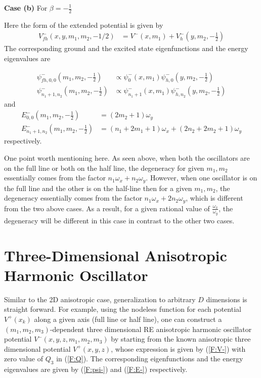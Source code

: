 \documentclass[12pt]{article}
\numberwithin{equation}{section} %
\begin{document}
{\bf Case (b)} For \(\beta = -\frac{1}{2}\)

Here the form of the extended potential is given by
\begin{align}
	V^-_{fh}(x,y,m_1,m_2,-1/2) &= V^-(x,m_1)+V_h^-(y,m_2,-\frac{1}{2})
\end{align}
The corresponding ground and the excited state eigenfunctions and the energy 
eigenvalues are

\begin{align}
	\psi^-_{fh,0,0}(m_1,m_2,-\frac{1}{2}) &\propto \psi^-_0 (x,m_1)\psi^-_{h,0}(y,m_2,-\frac{1}{2})  \\ 
	\psi^-_{n_1+1,n_2}(m_1,m_2,-\frac{1}{2}) &\propto \psi^-_{n_1+1} (x,m_1)\psi^-_{h,n_2}(y,m_2,-\frac{1}{2})
\end{align}
and 
\begin{align} 
	E^-_{0,0}(m_1,m_2,-\frac{1}{2}) &=\left(2m_2+1\right)\omega_y\\
	E^-_{n_1+1,n_2}(m_1,m_2,-\frac{1}{2}) &= \left(n_1+2m_1+1\right)\omega_x+ \left(2n_2+2m_2+1\right)\omega_y
\end{align}
respectively. 

One point worth mentioning here. As seen above, when both the oscillators are on the full line or both on the half line, the degeneracy for given $m_1,m_2$ essentially comes from the factor $n_1\omega_x+n_2\omega_y$. However, when one oscillator is on the full line and the other is on the half-line then for a given $m_1,m_2$, the degeneracy essentially comes from the factor $n_1\omega_x+2n_2\omega_y$, which is different from the two above cases.  As a result, for a given rational value of $\frac{\omega_x}{\omega_y}$, the degeneracy will be different in this case in contrast to the other two cases.



\section{Three-Dimensional Anisotropic Harmonic Oscillator}

Similar to the 2D anisotropic case, generalization to arbitrary $D$ dimensions 
is straight forward. For example, using the nodeless function for each 
potential \(V^+(x_k)\) along a given axis (full line or half line), one can 
construct a $(m_1,m_2,m_3)$-dependent three dimensional RE anisotropic harmonic
oscillator potential \(V^-(x,y,z,m_1,m_2,m_3)\) by starting from the known 
anisotropic three dimensional potential \(V^+(x,y,z)\), whose expression is 
given by (\ref{F:V-}) with zero value of \(Q_3\) in (\ref{F:Q}). The 
corresponding eigenfunctions and the energy eigenvalues are given by 
(\ref{F:psi-}) and (\ref{F:E-}) respectively. 
\end{document}
